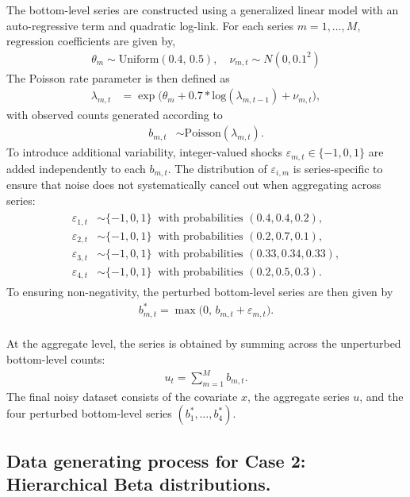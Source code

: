 The bottom-level series are constructed using a generalized linear model with an auto-regressive term and quadratic log-link. For each series \(m=1,\dots,M\), regression coefficients are given by,
\begin{align*}
\theta_{m} \sim \text{Uniform}(0.4,\,0.5), \quad \nu_{m,t} \sim N(0, 0.1^2)
\end{align*}
The Poisson rate parameter is then defined as
\begin{align*}
\lambda_{m,t} &= \exp\!\big( \theta_{m} + 0.7*\text{log}(\lambda_{m,t-1}) + \nu_{m,t} \big),
\end{align*}
with observed counts generated according to
\begin{align*}
b_{m,t} &\sim \text{Poisson}(\lambda_{m,t}).
\end{align*}
To introduce additional variability, integer-valued shocks
\(\varepsilon_{m,t} \in \{-1,0,1\}\) are added independently to each \(b_{m,t}\).
The distribution of \(\varepsilon_{i,m}\) is series-specific to ensure that noise does not systematically cancel out when aggregating across series:
\begin{align*}
\begin{aligned}
\varepsilon_{1,t} &\sim \{-1,0,1\} \;\; \text{with probabilities } (0.4, 0.4, 0.2), \\
\varepsilon_{2,t} &\sim \{-1,0,1\} \;\; \text{with probabilities } (0.2, 0.7, 0.1), \\
\varepsilon_{3,t} &\sim \{-1,0,1\} \;\; \text{with probabilities } (0.33, 0.34, 0.33), \\
\varepsilon_{4,t} &\sim \{-1,0,1\} \;\; \text{with probabilities } (0.2, 0.5, 0.3).
\end{aligned}
\end{align*}
To ensuring non-negativity, the perturbed bottom-level series are then given by
\begin{align*}
b^{*}_{m,t} = \max\!\big(0,\, b_{m,t} + \varepsilon_{m,t}\big).
\end{align*}\\
At the aggregate level, the series is obtained by summing across the unperturbed bottom-level counts:
\begin{align*}
u_t  = \sum_{m=1}^M b_{m,t}.
\end{align*}
The final noisy dataset consists of the covariate \(x\), the aggregate series \(u\), and the four perturbed bottom-level series \((b^{\ast}_{1},\dots,b^{\ast}_{4})\).

\subsection{Data generating process for Case 2: Hierarchical Beta distributions.}\label{data-generating-process-for-case-2-hierarchical-beta-distributions.}

